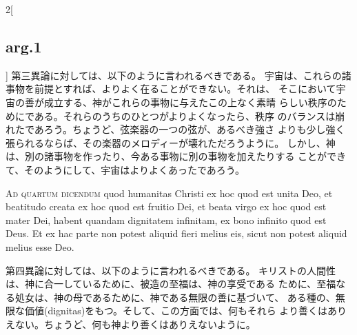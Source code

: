 \documentclass[paper=a4paper,fontsize=10pt,jafontsize=9pt,titlepage]{jlreq}
\begin{document}
\begin{paracol}{2}[\subsection{arg.1}]
第三異論に対しては、以下のように言われるべきである。
宇宙は、これらの諸事物を前提とすれば、よりよく在ることができない。それは、
 そこにおいて宇宙の善が成立する、神がこれらの事物に与えたこの上なく素晴
 らしい秩序のためにである。それらのうちのひとつがよりよくなったら、秩序
 のバランスは崩れたであろう。ちょうど、弦楽器の一つの弦が、あるべき強さ
 よりも少し強く張られるならば、その楽器のメロディーが壊れただろうように。
 しかし、神は、別の諸事物を作ったり、今ある事物に別の事物を加えたりする
 ことができて、そのようにして、宇宙はよりよくあったであろう。

\switchcolumn*[\subsection{ad.4}]

{\scshape Ad quartum dicendum} quod humanitas Christi ex
hoc quod est unita Deo, et beatitudo creata ex hoc quod est fruitio Dei,
et beata virgo ex hoc quod est mater Dei, habent quandam dignitatem
infinitam, ex bono infinito quod est Deus. Et ex hac parte non potest
aliquid fieri melius eis, sicut non potest aliquid melius esse Deo.

\switchcolumn

第四異論に対しては、以下のように言われるべきである。
キリストの人間性は、神に合一しているために、被造の至福は、神の享受である
 ために、至福なる処女は、神の母であるために、神である無限の善に基づいて、
 ある種の、無限な価値(dignitas)をもつ。そして、この方面では、何もそれら
 より善くはありえない。ちょうど、何も神より善くはありえないように。

\end{paracol}
\newpage
\end{document}
